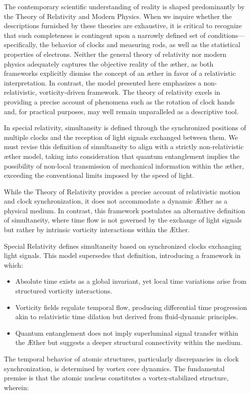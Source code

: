 \documentclass[a4paper,10pt]{article}
\begin{document}
    The contemporary scientific understanding of reality is shaped predominantly by the Theory of Relativity and Modern Physics. When we inquire whether the descriptions furnished by these theories are exhaustive, it is critical to recognize that such completeness is contingent upon a narrowly defined set of conditions—specifically, the behavior of clocks and measuring rods, as well as the statistical properties of electrons. Neither the general theory of relativity nor modern physics adequately captures the objective reality of the æther, as both frameworks explicitly dismiss the concept of an æther in favor of a relativistic interpretation. In contrast, the model presented here emphasizes a non-relativistic, vorticity-driven framework. The theory of relativity excels in providing a precise account of phenomena such as the rotation of clock hands and, for practical purposes, may well remain unparalleled as a descriptive tool.

    In special relativity, simultaneity is defined through the synchronized positions of multiple clocks and the reception of light signals exchanged between them. We must revise this definition of simultaneity to align with a strictly non-relativistic æther model, taking into consideration that quantum entanglement implies the possibility of non-local transmission of mechanical information within the æther, exceeding the conventional limits imposed by the speed of light.

    While the Theory of Relativity provides a precise account of relativistic motion and clock synchronization, it does not accommodate a dynamic \AE ther as a physical medium. In contrast, this framework postulates an alternative definition of simultaneity, where time flow is not governed by the exchange of light signals but rather by intrinsic vorticity interactions within the \AE ther.

    Special Relativity defines simultaneity based on synchronized clocks exchanging light signals. This model supersedes that definition, introducing a framework in which:

    \begin{itemize}
    \item Absolute time exists as a global invariant, yet local time variations arise from structured vorticity interactions.
    \item Vorticity fields regulate temporal flow, producing differential time progression akin to relativistic time dilation but derived from fluid-dynamic principles.
    \item Quantum entanglement does not imply superluminal signal transfer within the \AE ther but suggests a deeper structural connectivity within the medium.
    \end{itemize}
    The temporal behavior of atomic structures, particularly discrepancies in clock synchronization, is determined by vortex core dynamics. The fundamental premise is that the atomic nucleus constitutes a vortex-stabilized structure, wherein:
\end{document}
